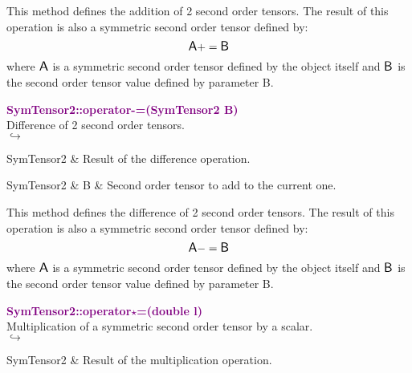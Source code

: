 This method defines the addition of 2 second order tensors.
The result of this operation is also a symmetric second order tensor defined by:
\begin{equation*}
\mbox{\large\ensuremath{\mathsf{A}}} += \mbox{\large\ensuremath{\mathsf{B}}}
\end{equation*}
where $\mbox{\large\ensuremath{\mathsf{A}}}$ is a symmetric second order tensor defined by the object itself and $\mbox{\large\ensuremath{\mathsf{B}}}$ is the second order tensor value defined by parameter B.

\textcolor{purple}{\textbf{SymTensor2::operator-=(SymTensor2 B)}}\label{SymTensor2::operator-=(SymTensor2 B)}\\
Difference of 2 second order tensors.\\ \hspace*{5mm}$\hookrightarrow$
\vspace*{-2em}\begin{tcolorbox}[grow to left by=-1cm, width=\textwidth-1cm,myArgs,tabularx={l|R}]
SymTensor2 & Result of the difference operation.
\end{tcolorbox}

\begin{tcolorbox}[width=\textwidth,myArgs,tabularx={ll|R}]
SymTensor2 & B & Second order tensor to add to the current one.
\end{tcolorbox}

This method defines the difference of 2 second order tensors.
The result of this operation is also a symmetric second order tensor defined by:
\begin{equation*}
\mbox{\large\ensuremath{\mathsf{A}}} -= \mbox{\large\ensuremath{\mathsf{B}}}
\end{equation*}
where $\mbox{\large\ensuremath{\mathsf{A}}}$ is a symmetric second order tensor defined by the object itself and $\mbox{\large\ensuremath{\mathsf{B}}}$ is the second order tensor value defined by parameter B.

\textcolor{purple}{\textbf{SymTensor2::operator$\star$=(double l)}}\label{SymTensor2::operator*=(double l)}\\
Multiplication of a symmetric second order tensor by a scalar.\\ \hspace*{5mm}$\hookrightarrow$
\vspace*{-2em}\begin{tcolorbox}[grow to left by=-1cm, width=\textwidth-1cm,myArgs,tabularx={l|R}]
SymTensor2 & Result of the multiplication operation.
\end{tcolorbox}

